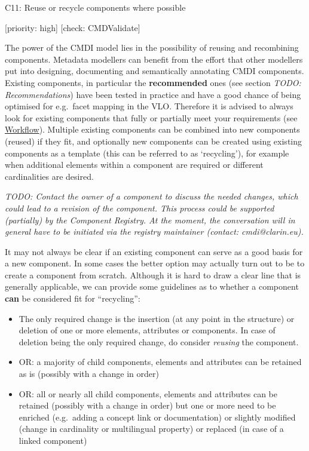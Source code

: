 C11: Reuse or recycle components where possible

{[}priority: high{]} {[}check: CMDValidate{]}

The power of the CMDI model lies in the possibility of reusing and
recombining components. Metadata modellers can benefit from the effort
that other modellers put into designing, documenting and semantically
annotating CMDI components. Existing components, in particular the
\textbf{recommended} ones (see section \emph{TODO: Recommendations})
have been tested in practice and have a good chance of being optimised
for e.g.~facet mapping in the VLO. Therefore it is advised to always
look for existing components that fully or partially meet your
requirements (see \href{./workflow.md}{Workflow}). Multiple existing
components can be combined into new components (reused) if they fit, and
optionally new components can be created using existing components as a
template (this can be referred to as `recycling'), for example when
additional elements within a component are required or different
cardinalities are desired.

\emph{TODO: Contact the owner of a component to discuss the needed
changes, which could lead to a revision of the component. This process
could be supported (partially) by the Component Registry. At the moment,
the conversation will in general have to be initiated via the registry
maintainer (contact: cmdi@clarin.eu).}

It may not always be clear if an existing component can serve as a good
basis for a new component. In some cases the better option may actually
turn out to be to create a component from scratch. Although it is hard
to draw a clear line that is generally applicable, we can provide some
guidelines as to whether a component \textbf{can} be considered fit for
``recycling'':

\begin{itemize}
\tightlist
\item
  The only required change is the insertion (at any point in the
  structure) or deletion of one or more elements, attributes or
  components. In case of deletion being the only required change, do
  consider \emph{reusing} the component.
\item
  OR: a majority of child components, elements and attributes can be
  retained as is (possibly with a change in order)
\item
  OR: all or nearly all child components, elements and attributes can be
  retained (possibly with a change in order) but one or more need to be
  enriched (e.g.~adding a concept link or documentation) or slightly
  modified (change in cardinality or multilingual property) or replaced
  (in case of a linked component)
\end{itemize}

